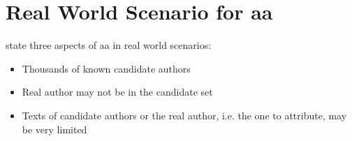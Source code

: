 \section{Real World Scenario for \ac{aa}}
\label{sec:real_world_scenario_authorship_attribution}

\citet{koppel_authorship_2011} state three aspects of \ac{aa} in real world scenarios:
\begin{itemize}
    \item Thousands of known candidate authors
    \item Real author may not be in the candidate set
    \item Texts of candidate authors or the real author, i.e. the one to attribute, may be very limited
\end{itemize}